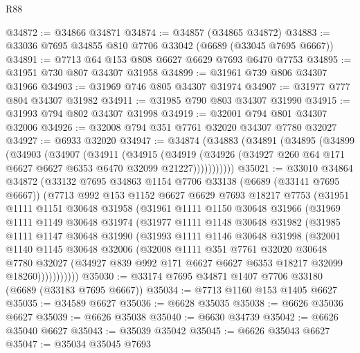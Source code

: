 \begin{lexlean}{R88}
\begin{coremodule}
@34872 := @34866 @34871
@34874 := @34857 (@34865 @34872)
@34883 := @33036 @7695 @34855 @810 @7706 @33042 (@6689 (@33045 @7695 @6667))
@34891 := @7713 @64 @153 @808 @6627 @6629 @7693 @6470 @7753
@34895 := @31951 @730 @807 @34307 @31958
@34899 := @31961 @739 @806 @34307 @31966
@34903 := @31969 @746 @805 @34307 @31974
@34907 := @31977 @777 @804 @34307 @31982
@34911 := @31985 @790 @803 @34307 @31990
@34915 := @31993 @794 @802 @34307 @31998
@34919 := @32001 @794 @801 @34307 @32006
@34926 := @32008 @794 @351 @7761 @32020 @34307 @7780 @32027
@34927 := @6933 @32020
@34947 := @34874
    (@34883
      (@34891
        (@34895
          (@34899
            (@34903
              (@34907
                (@34911
                  (@34915
                    (@34919
                      (@34926 (@34927 @260 @64 @171 @6627 @6627 @6353 @6470 @32099 @21227)))))))))))
@35021 := @33010
    @34864
    @34872
    (@33132
      @7695
      @34863
      @1154
      @7706
      @33138
      (@6689 (@33141 @7695 @6667))
      (@7713
        @992
        @153
        @1152
        @6627
        @6629
        @7693
        @18217
        @7753
        (@31951
          @1111
          @1151
          @30648
          @31958
          (@31961
            @1111
            @1150
            @30648
            @31966
            (@31969
              @1111
              @1149
              @30648
              @31974
              (@31977
                @1111
                @1148
                @30648
                @31982
                (@31985
                  @1111
                  @1147
                  @30648
                  @31990
                  (@31993
                    @1111
                    @1146
                    @30648
                    @31998
                    (@32001
                      @1140
                      @1145
                      @30648
                      @32006
                      (@32008
                        @1111
                        @351
                        @7761
                        @32020
                        @30648
                        @7780
                        @32027
                        (@34927 @839 @992 @171 @6627 @6627 @6353 @18217 @32099 @18260)))))))))))
@35030 := @33174 @7695 @34871 @1407 @7706 @33180 (@6689 (@33183 @7695 @6667))
@35034 := @7713 @1160 @153 @1405 @6627
@35035 := @34589 @6627
@35036 := @6628 @35035
@35038 := @6626 @35036 @6627
@35039 := @6626 @35038
@35040 := @6630 @34739
@35042 := @6626 @35040 @6627
@35043 := @35039 @35042
@35045 := @6626 @35043 @6627
@35047 := @35034 @35045 @7693

\end{coremodule}
\end{lexlean}
